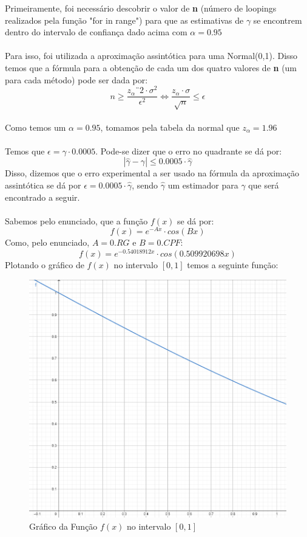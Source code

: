 \documentclass{article}
\begin{document}
    Primeiramente, foi necessário descobrir o valor de \textbf{n} (número de loopings realizados pela função "for in range") para que as estimativas de $\gamma$ se encontrem dentro do intervalo de confiança dado acima com $\alpha = 0.95$\\
    \\
    Para isso, foi utilizada a aproximação assintótica para uma Normal(0,1). Disso temos que a fórmula para a obtenção de cada um dos quatro valores de \textbf{n} (um para cada método) pode ser dada por:\\
    $$n \geq \frac{z_\alpha¨2 \cdot \sigma^2}{\epsilon^2} \Leftrightarrow \frac{z_\alpha \cdot \sigma}{\sqrt{n}} \leq \epsilon $$
    \\
    Como temos um $\alpha=0.95$, tomamos pela tabela da normal que $z_\alpha = 1.96$\\
    \\
     Temos que $\epsilon = \gamma \cdot0.0005$. Pode-se dizer que o erro no quadrante se dá por:\\
    $$ |\hat{\gamma}-\gamma| \leq 0.0005\cdot \hat{\gamma}$$
    Disso, dizemos que o erro experimental a ser usado na fórmula da aproximação assintótica se dá por
    $\epsilon = 0.0005\cdot \hat{\gamma}$, sendo $\hat{\gamma}$ um estimador para $\gamma$ que será encontrado a seguir.\\
    \\
    Sabemos pelo enunciado, que a função $f(x)$ se dá por:\\
    $$ f(x) = e^{-Ax}\cdot cos(Bx) $$
    Como, pelo enunciado, $A = 0.RG$ e $B = 0.CPF$:\\
    $$ f(x) = e^{-0.54018912x}\cdot cos(0.509920698x) $$
    Plotando o gráfico de $f(x)$ no intervalo $[0,1]$ temos a seguinte função:
    \begin{figure}[H]
        \centering
        \includegraphics[width=.75\textwidth]{gráfico f(x).png}
        \caption{Gráfico da Função $f(x)$ no intervalo $[0,1]$}
        \label{fig:grafico}
    \end{figure}
\end{document}
